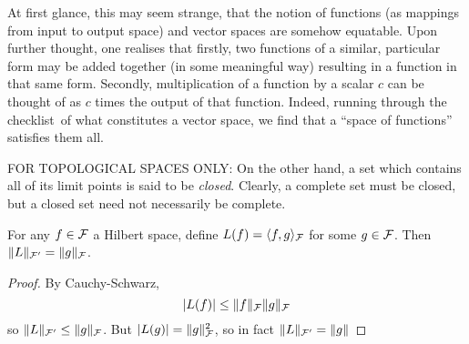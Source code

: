 At first glance, this may seem strange, that the notion of functions (as mappings from input to output space) and vector spaces are somehow equatable.
Upon further thought, one realises that firstly, two functions of a similar, particular form may be added together (in some meaningful way) resulting in a function in that same form. 
Secondly, multiplication of a function by a scalar $c$ can be thought of as $c$ times the output of that function.
Indeed, running through the checklist\footnotemark~of what constitutes a vector space, we find that a ``space of functions'' satisfies them all.

FOR TOPOLOGICAL SPACES ONLY: 
On the other hand, a set which contains all of its limit points is said to be \emph{closed}.
Clearly, a complete set must be closed, but a closed set need not necessarily be complete.

\begin{corollary}
  For any $f\in{\mathcal F}$ a Hilbert space, define $L(f) = \langle f,g\rangle_{\mathcal F}$ for some $g\in{\mathcal F}$.
  Then $\lVert L\rVert_{{\mathcal F}'} = \lVert g\rVert_{\mathcal F}$. 
\end{corollary}

\begin{proof}
  By Cauchy-Schwarz,
  \[
    |L(f)| \leq \lVert f\rVert_{\mathcal F}\lVert g\rVert_{\mathcal F}
  \]
  so $\lVert L\rVert_{{\mathcal F}'}\leq \lVert g\rVert_{\mathcal F}$.
  But  $|L(g)| = \lVert g\rVert_{\mathcal F}^2$, so in fact $\lVert L\rVert_{{\mathcal F}'} = \lVert g\rVert$
\end{proof}